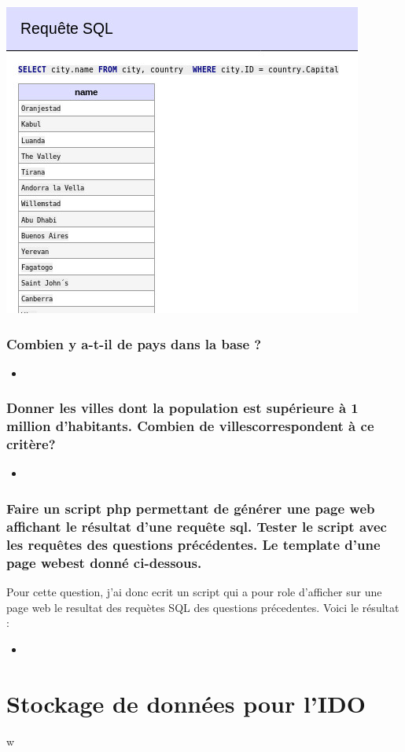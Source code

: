 \documentclass[a4paper,10pt]{article}
\newcommand{\insertcode}[2]{\begin{itemize}\item[]\end{itemize}}
\begin{document}
\includegraphics[scale=0.8]{ressource/3.jpg}

\newpage


\subsubsection{Combien y a-t-il de pays dans la base ? }
\insertcode{commande/5.txt}{count() }
\subsubsection{Donner les villes dont la population est supérieure à 1 million d’habitants. Combien de villescorrespondent à ce critère?}

\insertcode{commande/6.txt}{Requetes}

\subsubsection{Faire un script php permettant de générer une page web affichant le résultat d’une requête sql. Tester le script avec les requêtes des questions précédentes. Le template d’une page webest donné ci-dessous.}
Pour cette question, j'ai donc ecrit un script qui a pour role d'afficher sur une page web le resultat des requètes SQL des questions précedentes. Voici le résultat :
\insertcode{ressource/code.php}{php script}

\section{Stockage de données pour l’IDO}
w
\end{document}
